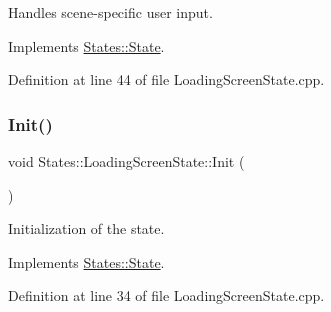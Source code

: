 Handles scene-\/specific user input. 

\begin{DoxyVerb}\end{DoxyVerb}
 

Implements \mbox{\hyperlink{class_states_1_1_state_a9f5a1461456ad43c936808c9cfb9e8bd}{States\+::\+State}}.



Definition at line 44 of file Loading\+Screen\+State.\+cpp.


\begin{DoxyCode}{0}

\end{DoxyCode}
\mbox{\label{class_states_1_1_loading_screen_state_aa6783276ac59b0c137d062251ddc719a}} 
\subsubsection{\texorpdfstring{Init()}{Init()}}
{\footnotesize\ttfamily void States\+::\+Loading\+Screen\+State\+::\+Init (\begin{DoxyParamCaption}{ }\end{DoxyParamCaption})\hspace{0.3cm}{\ttfamily [virtual]}}



Initialization of the state. 

\begin{DoxyVerb}\end{DoxyVerb}
 

Implements \mbox{\hyperlink{class_states_1_1_state_aff396dd3b4f3f7f7e729a0eac1910f45}{States\+::\+State}}.



Definition at line 34 of file Loading\+Screen\+State.\+cpp.


